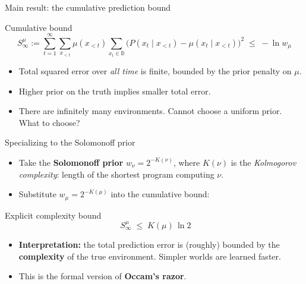 \documentclass[10pt]{beamer}
\newcommand{\cM}{\mathcal{M}}
\newcommand{\B}{\mathbb{B}}
\begin{document}

\begin{frame}{Main result: the cumulative prediction bound}
\begin{block}{Cumulative bound}
\[
S_\infty^\mu := \sum_{t=1}^{\infty} \sum_{x_{<t}} \mu(x_{<t})
    \sum_{x_t \in \B} \big( P(x_t \mid x_{<t}) - \mu(x_t \mid x_{<t}) \big)^2
\;\leq\; -\ln w_\mu
\]
\end{block}
\begin{itemize}
    \item Total squared error over \emph{all time} is finite, bounded by the prior penalty on $\mu$.
    \item Higher prior on the truth implies smaller total error.
    \item There are infinitely many environments. Cannot choose a uniform prior. What to choose?
\end{itemize}
\end{frame}

\begin{frame}{Specializing to the Solomonoff prior}
\begin{itemize}
    \item Take the \textbf{Solomonoff prior} $w_\nu = 2^{-K(\nu)}$, where $K(\nu)$ is the
    \emph{Kolmogorov complexity}: length of the shortest program computing $\nu$.
    \pause
    \item Substitute $w_\mu = 2^{-K(\mu)}$ into the cumulative bound:
\end{itemize}
\begin{block}{Explicit complexity bound}
\[
\; S^\mu_\infty \;\leq\; K(\mu)\,\ln 2 
\]
\end{block}
\pause
\begin{itemize}
    \item \textbf{Interpretation:} the total prediction error is (roughly) bounded by the
    \textbf{complexity} of the true environment. Simpler worlds are learned faster.
    \item This is the formal version of \textbf{Occam's razor}.
\end{itemize}
\end{frame}
\end{document}
